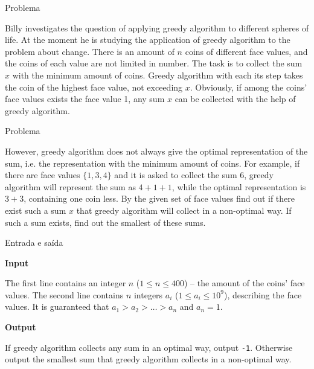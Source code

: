 
\begin{frame}[fragile]{Problema}

Billy investigates the question of applying greedy algorithm to different spheres of life. At the
moment he is studying the application of greedy algorithm to the problem about change. There is an
amount of $n$ coins of different face values, and the coins of each value are not limited in
number. The task is to collect the sum $x$ with the minimum amount of coins. Greedy algorithm with
each its step takes the coin of the highest face value, not exceeding $x$. Obviously, if among the
coins' face values exists the face value 1, any sum $x$ can be collected with the help of greedy
algorithm.

\end{frame}


\begin{frame}[fragile]{Problema}

However, greedy algorithm does not always give the optimal representation of the sum, i.e. the
representation with the minimum amount of coins. For example, if there are face values
$\{1, 3, 4\}$ and it is asked to collect the sum $6$, greedy algorithm will represent the sum as 
$4 + 1 + 1$, while the optimal representation is $3 + 3$, containing one coin less. By the given
set of face values find out if there exist such a sum $x$ that greedy algorithm will collect in a
non-optimal way. If such a sum exists, find out the smallest of these sums.

\end{frame}

\begin{frame}[fragile]{Entrada e saída}

\textbf{Input}

The first line contains an integer $n$ ($1\leq n\leq 400$) -- the amount of the coins' face values.
The second line contains $n$ integers $a_i$ ($1\leq a_i\leq 10^9$), describing the face values. It
is guaranteed that $a_1 > a_2 > \ldots > a_n$ and $a_n = 1$.

\vspace{0.2in}

\textbf{Output}

If greedy algorithm collects any sum in an optimal way, output \texttt{-1}. Otherwise output the
smallest sum that greedy algorithm collects in a non-optimal way.

\end{frame}

